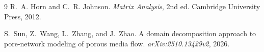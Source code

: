 \documentclass[11pt,a4paper]{article}
\begin{document}
\begin{thebibliography}{9}
R.~A. Horn and C.~R. Johnson.
\newblock \emph{Matrix Analysis}, 2nd ed.
\newblock Cambridge University Press, 2012.

S.~Sun, Z.~Wang, L.~Zhang, and J.~Zhao.
\newblock A domain decomposition approach to pore-network modeling of porous
media flow.
\newblock \emph{arXiv:2510.13429v2}, 2026.
\end{thebibliography}
\end{document}
